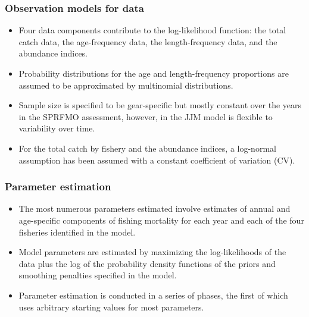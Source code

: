 \documentclass{article}
\begin{document}
\subsubsection{Observation models for data}

\begin{itemize}

\item Four data components contribute to the log-likelihood function: the total catch data, the age-frequency data, the length-frequency data, and the abundance indices.

\item Probability distributions for the age and length-frequency proportions are assumed to be approximated by multinomial distributions.

\item Sample size is specified to be gear-specific but mostly constant over the years in the SPRFMO assessment, however, in the JJM model is flexible to variability over time.

\item For the total catch by fishery and the abundance indices, a log-normal assumption has been assumed with a constant coefficient of variation (CV).

\end{itemize}


\subsubsection{Parameter estimation}

\begin{itemize}

\item The most numerous parameters estimated involve estimates of annual and age-specific components of fishing mortality for each year and each of the four fisheries identified in the model.

\item Model parameters are estimated by maximizing the log-likelihoods of the data plus the log of the probability density functions of the priors and smoothing penalties specified in the model.

\item Parameter estimation is conducted in a series of phases, the first of which uses arbitrary starting values for most parameters.

\end{itemize}
\end{document}
